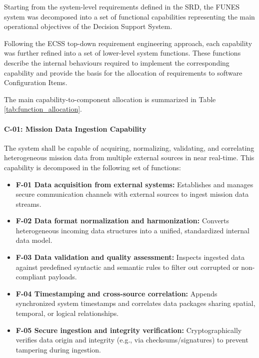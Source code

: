 Starting from the system-level requirements defined in the SRD, the FUNES system was decomposed into a set of functional capabilities representing the main operational objectives of the Decision Support System.

Following the ECSS top-down requirement engineering approach, each capability was further refined into a set of lower-level system functions. These functions describe the internal behaviours required to implement the corresponding capability and provide the basis for the allocation of requirements to software Configuration Items.


The main capability-to-component allocation is summarized in Table \ref{tab:function_allocation}.

\paragraph{C-01: Mission Data Ingestion Capability}
The system shall be capable of acquiring, normalizing, validating, and correlating heterogeneous mission data from multiple external sources in near real-time. This capability is decomposed in the following set of functions:
\begin{itemize}
    \item \textbf{F-01 Data acquisition from external systems:} Establishes and manages secure communication channels with external sources to ingest mission data streams.
    \item \textbf{F-02 Data format normalization and harmonization:} Converts heterogeneous incoming data structures into a unified, standardized internal data model.
    \item \textbf{F-03 Data validation and quality assessment:} Inspects ingested data against predefined syntactic and semantic rules to filter out corrupted or non-compliant payloads.
    \item \textbf{F-04 Timestamping and cross-source correlation:} Appends synchronized system timestamps and correlates data packages sharing spatial, temporal, or logical relationships.
    \item \textbf{F-05 Secure ingestion and integrity verification:} Cryptographically verifies data origin and integrity (e.g., via checksums/signatures) to prevent tampering during ingestion.
\end{itemize}

